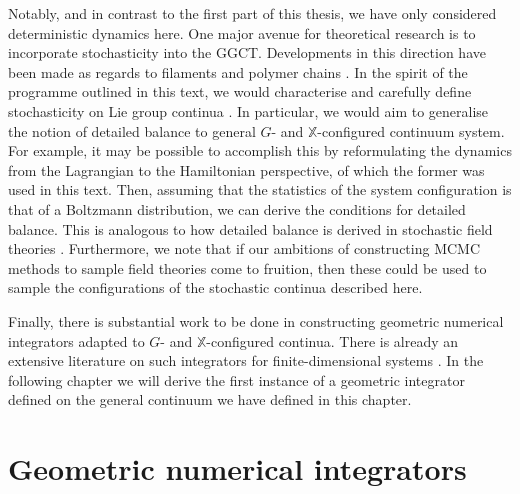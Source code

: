 Notably, and in contrast to the first part of this thesis, we have only considered deterministic dynamics here. One major avenue for theoretical research is to incorporate stochasticity into the GGCT. Developments in this direction have been made as regards to filaments and polymer chains \citep{chirikjianStochasticElasticaExcludedVolume2008, bawendiWienerIntegralModel1985, kleinertPathIntegralsQuantum2009, liverpoolProbabilityDistributionWormlike1995}. In the spirit of the programme outlined in this text, we would characterise and carefully define stochasticity on Lie group continua \citep{chirikjianStochasticProcessesLie2012}. In particular, we would aim to generalise the notion of detailed balance to general $G$- and $\mathbb{X}$-configured continuum system. For example, it may be possible to accomplish this by reformulating the dynamics from the Lagrangian to the Hamiltonian perspective, of which the former was used in this text. Then, assuming that the statistics of the system configuration is that of a Boltzmann distribution, we can derive the conditions for detailed balance. This is analogous to how detailed balance is derived in stochastic field theories \citep{catesActiveFieldTheories2019}. Furthermore, we note that if our ambitions of constructing MCMC methods to sample field theories come to fruition, then these could be used to sample the configurations of the stochastic continua described here.

Finally, there is substantial work to be done in constructing geometric numerical integrators adapted to $G$- and $\mathbb{X}$-configured continua. There is already an extensive literature on such integrators for finite-dimensional systems \citep{celledoniIntroductionLieGroup2014c, owrenLieGroupIntegrators2016, iserlesLiegroupMethods2005, celledoniLieGroupIntegrators2022a}. In the following chapter we will derive the first instance of a geometric integrator defined on the general continuum we have defined in this chapter.





\chapter{Geometric numerical integrators} \label{ch:Geometric numerical integrators}

